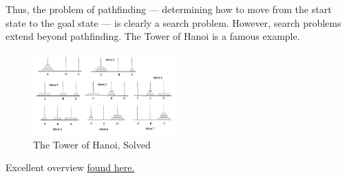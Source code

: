 \documentclass[12pt]{article}
\begin{document}
\bigskip

Thus, the problem of pathfinding — determining how to move from the start state to the goal state — is clearly a search problem. However, search problems extend beyond pathfinding. The Tower of Hanoi is a famous example.

\begin{figure}[h]
  \centering
  \includegraphics[width=0.5\textwidth]{general-search-hanoi.jpg}
  \caption{The Tower of Hanoi, Solved}
  \label{fig:tower}
\end{figure}

Excellent overview \href{https://youtu.be/Mlwrx7hbKPs?t=3913}{found here.}
\end{document}
